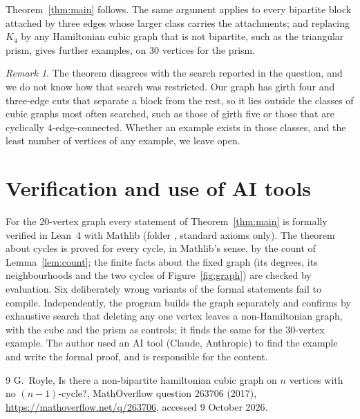 \documentclass[11pt]{amsart}
\theoremstyle{remark}
\newtheorem*{remark}{Remark}
\begin{document}
Theorem~\ref{thm:main} follows. The same argument applies to every bipartite block attached by three
edges whose larger class carries the attachments; and replacing $K_4$ by any Hamiltonian cubic graph
that is not bipartite, such as the triangular prism, gives further examples, on $30$ vertices for the
prism.

\begin{remark}
The theorem disagrees with the search reported in the question, and we do not know how that search
was restricted. Our graph has girth four and three-edge cuts that separate a block from the rest, so
it lies outside the classes of cubic graphs most often searched, such as those of girth five or those
that are cyclically $4$-edge-connected. Whether an example exists in those classes, and the least
number of vertices of any example, we leave open.
\end{remark}

\section*{Verification and use of AI tools}

For the $20$-vertex graph every statement of Theorem~\ref{thm:main} is formally verified in Lean~4
with Mathlib (folder , standard axioms only). The theorem about cycles is proved for every
cycle, in Mathlib's sense, by the count of Lemma~\ref{lem:count}; the finite facts about the fixed graph
(its degrees, its neighbourhoods and the two cycles of Figure~\ref{fig:graph}) are checked by
evaluation. Six deliberately wrong variants of the formal statements fail to compile. Independently,
the program  builds the graph separately and confirms by exhaustive search
that deleting any one vertex leaves a non-Hamiltonian graph, with the cube and the prism as controls; it
finds the same for the $30$-vertex example. The author used an AI tool (Claude, Anthropic) to find the
example and write the formal proof, and is responsible for the content.

\begin{thebibliography}{9}
 G.~Royle, Is there a non-bipartite hamiltonian cubic graph on $n$ vertices with no
$(n-1)$-cycle?, MathOverflow question 263706 (2017), \url{https://mathoverflow.net/q/263706},
accessed 9 October 2026.
\end{thebibliography}
\end{document}

